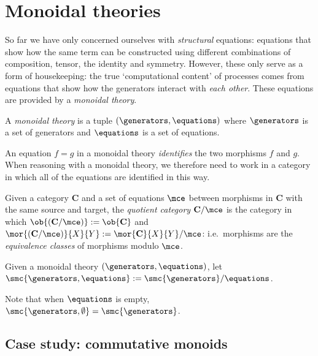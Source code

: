 \section{Monoidal theories}

So far we have only concerned ourselves with \emph{structural} equations:
equations that show how the same term can be constructed using different
combinations of composition, tensor, the identity and symmetry.
However, these only serve as a form of housekeeping: the true `computational
content' of processes comes from equations that show how the generators interact
with \emph{each other}.
These equations are provided by a \emph{monoidal theory}.

\begin{definition}
    A \emph{monoidal theory} is a tuple \((\generators, \equations)\) where
    \(\generators\) is a set of generators and \(\equations\) is a set of
    equations.
\end{definition}

An equation \(f = g\) in a monoidal theory \emph{identifies} the two morphisms
\(f\) and \(g\).
When reasoning with a monoidal theory, we therefore need to work in a category
in which all of the equations are identified in this way.

\begin{definition}
    Given a category \(\mathbf{C}\) and a set of equations \(\mce\) between
    morphisms in \(\mathbf{C}\) with the same source and target, the
    \emph{quotient category} \(\mathbf{C} / \mce\) is the category in which
    \(\ob{(\mathbf{C} / \mce)} := \ob{\mathbf{C}}\) and \(
            \mor{(\mathbf{C} / \mce)}{X}{Y}
            :=
            \mor{\mathbf{C}}{X}{Y} / \mce
    \): i.e.\ morphisms are the \emph{equivalence classes} of morphisms
    modulo \(\mce\).
\end{definition}

\begin{definition}
    Given a monoidal theory \((\generators, \equations)\), let
    \(\smc{\generators, \equations} := \smc{\generators} / \equations\).
\end{definition}

Note that when \(\equations\) is empty,
\(\smc{\generators, \emptyset} = \smc{\generators}\).

\subsection{Case study: commutative monoids}

